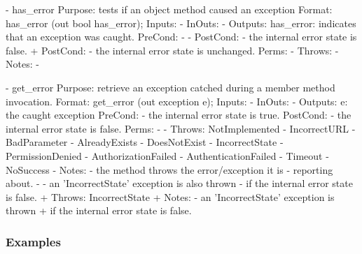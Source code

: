  \begin{myspec}
    - has_error
      Purpose:  tests if an object method caused an exception
      Format:   has_error     (out bool       has_error);
      Inputs:   -
      InOuts:   -
      Outputs:  has_error:     indicates that an exception was
                               caught.
      PreCond:  -
-     PostCond: - the internal error state is false.
+     PostCond: - the internal error state is unchanged.
      Perms:    -
      Throws:   -
      Notes:    - 
 
 
    - get_error
      Purpose:  retrieve an exception catched during a member
                method invocation.
      Format:   get_error     (out exception  e);
      Inputs:   -
      InOuts:   -
      Outputs:  e:             the caught exception
      PreCond:  - the internal error state is true.
      PostCond: - the internal error state is false.
      Perms:    -
-     Throws:   NotImplemented
-               IncorrectURL
-               BadParameter
-               AlreadyExists
-               DoesNotExist
-               IncorrectState
-               PermissionDenied
-               AuthorizationFailed
-               AuthenticationFailed
-               Timeout
-               NoSuccess
-     Notes:    - the method throws the error/exception it is
-                 reporting about.
-               - an 'IncorrectState' exception is also thrown 
-                 if the internal error state is false. 
+     Throws:   IncorrectState
+     Notes:    - an 'IncorrectState' exception is thrown 
+                 if the internal error state is false. 
 \end{myspec}
 
 
 \newpage
 
 \subsubsection{Examples}
 
